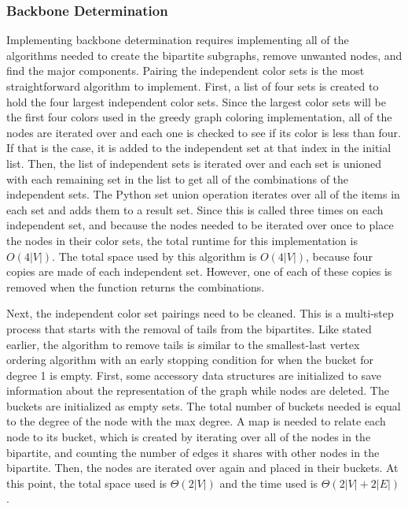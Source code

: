 \documentclass{article}
\begin{document}
        \subsubsection{Backbone Determination}
        Implementing backbone determination requires implementing all of the algorithms needed to create the bipartite subgraphs, remove unwanted nodes, and find the major components. Pairing the independent color sets is the most straightforward algorithm to implement. First, a list of four sets is created to hold the four largest independent color sets. Since the largest color sets will be the first four colors used in the greedy graph coloring implementation, all of the nodes are iterated over and each one is checked to see if its color is less than four. If that is the case, it is added to the independent set at that index in the initial list. Then, the list of independent sets is iterated over and each set is unioned with each remaining set in the list to get all of the combinations of the independent sets. The Python set union operation iterates over all of the items in each set and adds them to a result set. Since this is called three times on each independent set, and because the nodes needed to be iterated over once to place the nodes in their color sets, the total runtime for this implementation is $O(4|V|)$. The total space used by this algorithm is $O(4|V|)$, because four copies are made of each independent set. However, one of each of these copies is removed when the function returns the combinations.
        \par
        Next, the independent color set pairings need to be cleaned. This is a multi-step process that starts with the removal of tails from the bipartites. Like stated earlier, the algorithm to remove tails is similar to the smallest-last vertex ordering algorithm with an early stopping condition for when the bucket for degree 1 is empty. First, some accessory data structures are initialized to save information about the representation of the graph while nodes are deleted. The buckets are initialized as empty sets. The total number of buckets needed is equal to the degree of the node with the max degree. A map is needed to relate each node to its bucket, which is created by iterating over all of the nodes in the bipartite, and counting the number of edges it shares with other nodes in the bipartite. Then, the nodes are iterated over again and placed in their buckets. At this point, the total space used is $\Theta(2|V|)$ and the time used is $\Theta(2|V| + 2|E|)$.
        \par
\end{document}
